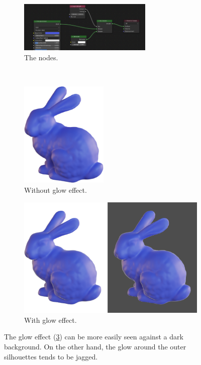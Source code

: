 \documentclass[10pt]{article}
\begin{document}
\begin{figure}[H]
    \centering
    \captionsetup{width=0.8\textwidth}
    \begin{subfigure}[b]{0.9\textwidth}
     \centering
     \includegraphics[width=0.7\textwidth]{images/2022-06-18_fresnel-glow-shading-nodes.png}
     \caption{The nodes.}
     \label{subfig:fresnel-glow-nodes}
    \end{subfigure} \\
    \begin{subfigure}[b]{0.45\textwidth}
     \centering
     \includegraphics[height=2in]{images/fresnel-glow-none.png}
     \caption{Without glow effect.}
     \label{subfig:fresnel-glow-none}
    \end{subfigure}
    \begin{subfigure}[b]{0.45\textwidth}
     \centering
     \includegraphics[height=2.3in]{images/fresnel-glow-effect.png}
     \caption{With glow effect.}
     \label{subfig:fresnel-glow}
    \end{subfigure}
    \caption{The glow effect (\ref{subfig:fresnel-glow}) can be more easily seen against a dark background. On the other hand, the glow around the outer silhouettes tends to be jagged.}
    \label{fig:fresnel-glow}
\end{figure}
\end{document}
